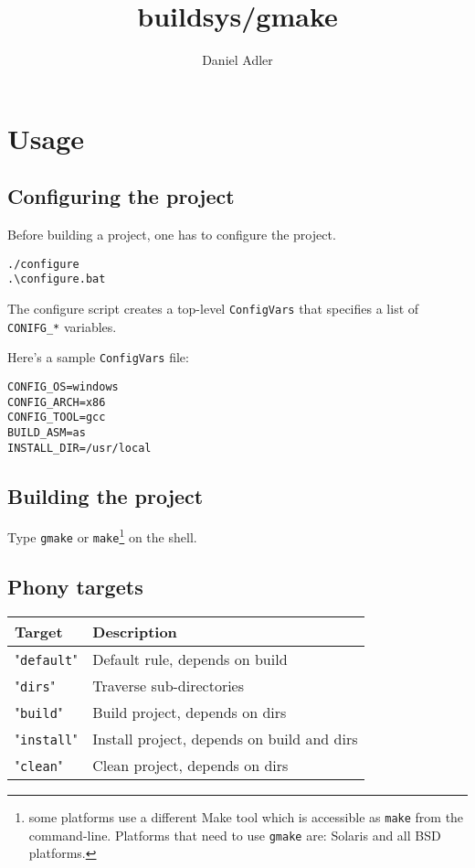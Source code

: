 \documentclass{article}
\newcommand{\var}[1]{{\tt #1}}
\newcommand{\val}[1]{"{\tt #1}"}
\newcommand{\file}[1]{{\tt #1}}
\begin{document}
\title{buildsys/gmake}
\author{Daniel Adler}
\maketitle

\section{Usage}

\subsection{Configuring the project}

Before building a project, one has to configure the project.

\begin{verbatim}
./configure
.\configure.bat
\end{verbatim}

The configure script creates a top-level \file{ConfigVars} that
specifies a list of \var{CONIFG\_*} variables.

Here's a sample \file{ConfigVars} file:

\begin{verbatim}
CONFIG_OS=windows
CONFIG_ARCH=x86
CONFIG_TOOL=gcc
BUILD_ASM=as
INSTALL_DIR=/usr/local
\end{verbatim}

\subsection{Building the project}

Type {\tt gmake} or {\tt make}\footnote{some platforms use a different Make tool which is accessible as
{\tt make} from the command-line. Platforms that need to use {\tt gmake} are: Solaris and all BSD platforms.} on the shell.

\subsection{Phony targets}

\begin{tabular}{ll}
Target  & Description				\\
\hline
\val{default}	& Default rule, depends on build	\\
\val{dirs}	& Traverse sub-directories		\\
\val{build}	& Build project, depends on dirs	\\
\val{install}	& Install project, depends on build and dirs \\
\val{clean}	& Clean project, depends on dirs	\\
\end{tabular}
\end{document}
